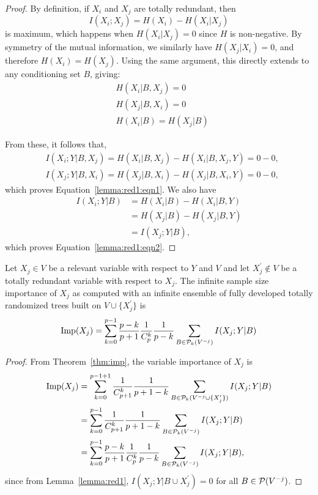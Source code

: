 \begin{proof}
By definition, if $X_i$ and $X_j$ are totally redundant, then
\begin{equation}
I(X_i;X_j) = H(X_i) - H(X_i|X_j)
\end{equation}
is maximum, which happens when $H(X_i|X_j) = 0$ since $H$ is non-negative.
By symmetry of the mutual information, we similarly have $H(X_j|X_i)=0$,
and therefore $H(X_i)=H(X_j)$. Using the same argument, this directly extends
to any conditioning set $B$, giving:
\begin{align}
& H(X_i|B,X_j) = 0\\
& H(X_j|B,X_i) = 0\\
& H(X_i|B) = H(X_j|B)
\end{align}

From these, it follows that,
\begin{align}
& I(X_i;Y|B,X_j) = H(X_i|B, X_j) - H(X_i|B,X_j,Y) = 0 - 0, \\
& I(X_j;Y|B,X_i) = H(X_j|B, X_i) - H(X_j|B,X_i,Y) = 0 - 0,
\end{align}
which proves Equation~\ref{lemma:red1:eqn1}. We also have
\begin{align}
I(X_i;Y|B) &= H(X_i|B) - H(X_i|B,Y) \\
           &= H(X_j|B) - H(X_j|B,Y) \\
           &= I(X_j;Y|B),
\end{align}
which proves Equation~\ref{lemma:red1:eqn2}.
\end{proof}

\begin{proposition}\label{prop:red:self}
Let $X_j\in V$ be a relevant variable with respect to $Y$ and $V$ and let
$X_j^\prime \notin V$ be a totally redundant variable with respect to $X_j$.
The infinite sample size importance of $X_j$ as computed with an infinite
ensemble of fully developed totally randomized trees built on $V\cup
\{X_j^\prime\}$ is
\begin{equation}
\text{Imp}(X_j) = \sum_{k=0}^{p-1} \frac{p-k}{p+1} \frac{1}{C_p^k} \frac{1}{p-k} \sum_{B \in {\cal P}_k(V^{-j})} I(X_j;Y|B)
\end{equation}
\end{proposition}

\begin{proof}
From Theorem~\ref{thm:imp}, the variable importance of $X_j$ is
\begin{align}
\text{Imp}(X_j) &= \sum_{k=0}^{p-1+1} \frac{1}{C_{p+1}^k} \frac{1}{p+1-k} \sum_{B \in {\cal P}_k(V^{-j} \cup \{X_j^\prime\})} I(X_j;Y|B) \nonumber \\
&= \sum_{k=0}^{p-1} \frac{1}{C_{p+1}^k} \frac{1}{p+1-k} \sum_{B \in {\cal P}_k(V^{-j})} I(X_j;Y|B) \nonumber \\
&= \sum_{k=0}^{p-1} \frac{p-k}{p+1} \frac{1}{C_{p}^k} \frac{1}{p-k} \sum_{B \in {\cal P}_k(V^{-j})} I(X_j;Y|B),
\end{align}
since from Lemma~\ref{lemma:red1}, $I(X_j;Y|B\cup X_j^\prime)=0$ for all $B \in {\cal P}(V^{-j})$.
\end{proof}

